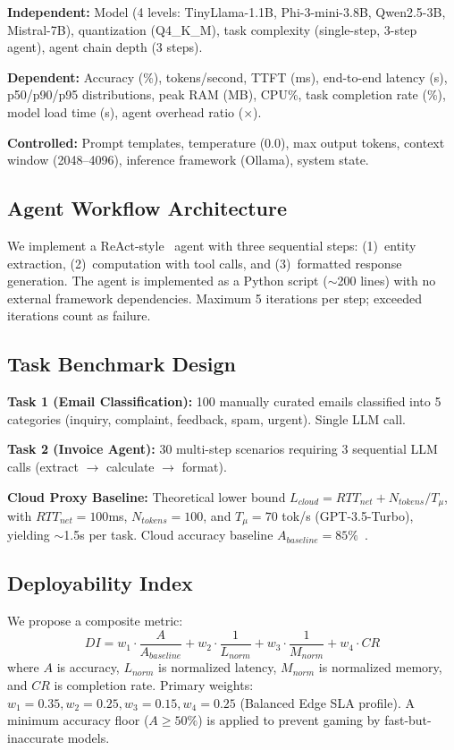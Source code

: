\documentclass[conference]{IEEEtran}
\begin{document}
\textbf{Independent:} Model (4 levels: TinyLlama-1.1B, Phi-3-mini-3.8B, Qwen2.5-3B, Mistral-7B), quantization (Q4\_K\_M), task complexity (single-step, 3-step agent), agent chain depth (3 steps).

\textbf{Dependent:} Accuracy (\%), tokens/second, TTFT (ms), end-to-end latency (s), p50/p90/p95 distributions, peak RAM (MB), CPU\%, task completion rate (\%), model load time (s), agent overhead ratio ($\times$).

\textbf{Controlled:} Prompt templates, temperature (0.0), max output tokens, context window (2048--4096), inference framework (Ollama), system state.

\subsection{Agent Workflow Architecture}

We implement a ReAct-style~\cite{yao2023react} agent with three sequential steps: (1)~entity extraction, (2)~computation with tool calls, and (3)~formatted response generation. The agent is implemented as a Python script ($\sim$200 lines) with no external framework dependencies. Maximum 5 iterations per step; exceeded iterations count as failure.

\subsection{Task Benchmark Design}

\textbf{Task 1 (Email Classification):} 100 manually curated emails classified into 5 categories (inquiry, complaint, feedback, spam, urgent). Single LLM call.

\textbf{Task 2 (Invoice Agent):} 30 multi-step scenarios requiring 3 sequential LLM calls (extract $\rightarrow$ calculate $\rightarrow$ format).

\textbf{Cloud Proxy Baseline:} Theoretical lower bound $L_{cloud} = RTT_{net} + N_{tokens}/T_\mu$, with $RTT_{net}=100$ms, $N_{tokens}=100$, and $T_\mu=70$ tok/s (GPT-3.5-Turbo), yielding $\sim$1.5s per task. Cloud accuracy baseline $A_{baseline}=85\%$~\cite{openai2023gpt4}.

\subsection{Deployability Index}

We propose a composite metric:
\begin{equation}
DI = w_1 \cdot \frac{A}{A_{baseline}} + w_2 \cdot \frac{1}{L_{norm}} + w_3 \cdot \frac{1}{M_{norm}} + w_4 \cdot CR
\end{equation}
where $A$ is accuracy, $L_{norm}$ is normalized latency, $M_{norm}$ is normalized memory, and $CR$ is completion rate. Primary weights: $w_1{=}0.35, w_2{=}0.25, w_3{=}0.15, w_4{=}0.25$ (Balanced Edge SLA profile). A minimum accuracy floor ($A \geq 50\%$) is applied to prevent gaming by fast-but-inaccurate models.
\end{document}
